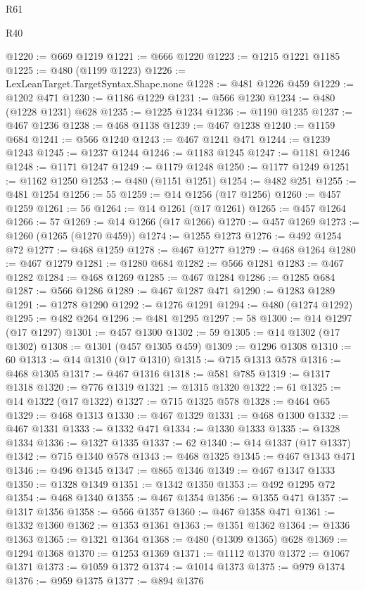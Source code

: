 \begin{lexlean}{R61}
\begin{lexlean}{R40}
\begin{coremodule}
{{{{{{{{{{{{{{{{{{{{{{{{{{{{{{{{{{{{{{{{{{{{{{{{{{{{{{{{{{{{{{{{{{{{{{{{{{{{{{{{{{{{{{{{{{{{{{{{{{{{{{{{{{{{{@1220 := @669 @1219
@1221 := @666 @1220
@1223 := @1215 @1221 @1185
@1225 := @480 (@1199 @1223)
@1226 := LexLeanTarget.TargetSyntax.Shape.none
@1228 := @481 @1226 @459
@1229 := @1202 @471
@1230 := @1186 @1229
@1231 := @566 @1230
@1234 := @480 (@1228 @1231) @628
@1235 := @1225 @1234
@1236 := @1190 @1235
@1237 := @467 @1236
@1238 := @468 @1138
@1239 := @467 @1238
@1240 := @1159 @684
@1241 := @566 @1240
@1243 := @467 @1241 @471
@1244 := @1239 @1243
@1245 := @1237 @1244
@1246 := @1183 @1245
@1247 := @1181 @1246
@1248 := @1171 @1247
@1249 := @1179 @1248
@1250 := @1177 @1249
@1251 := @1162 @1250
@1253 := @480 (@1151 @1251)
@1254 := @482 @251
@1255 := @481 @1254
@1256 := 55
@1259 := @14 @1256 (@17 @1256)
@1260 := @457 @1259
@1261 := 56
@1264 := @14 @1261 (@17 @1261)
@1265 := @457 @1264
@1266 := 57
@1269 := @14 @1266 (@17 @1266)
@1270 := @457 @1269
@1273 := @1260 (@1265 (@1270 @459))
@1274 := @1255 @1273
@1276 := @492 @1254 @72
@1277 := @468 @1259
@1278 := @467 @1277
@1279 := @468 @1264
@1280 := @467 @1279
@1281 := @1280 @684
@1282 := @566 @1281
@1283 := @467 @1282
@1284 := @468 @1269
@1285 := @467 @1284
@1286 := @1285 @684
@1287 := @566 @1286
@1289 := @467 @1287 @471
@1290 := @1283 @1289
@1291 := @1278 @1290
@1292 := @1276 @1291
@1294 := @480 (@1274 @1292)
@1295 := @482 @264
@1296 := @481 @1295
@1297 := 58
@1300 := @14 @1297 (@17 @1297)
@1301 := @457 @1300
@1302 := 59
@1305 := @14 @1302 (@17 @1302)
@1308 := @1301 (@457 @1305 @459)
@1309 := @1296 @1308
@1310 := 60
@1313 := @14 @1310 (@17 @1310)
@1315 := @715 @1313 @578
@1316 := @468 @1305
@1317 := @467 @1316
@1318 := @581 @785
@1319 := @1317 @1318
@1320 := @776 @1319
@1321 := @1315 @1320
@1322 := 61
@1325 := @14 @1322 (@17 @1322)
@1327 := @715 @1325 @578
@1328 := @464 @65
@1329 := @468 @1313
@1330 := @467 @1329
@1331 := @468 @1300
@1332 := @467 @1331
@1333 := @1332 @471
@1334 := @1330 @1333
@1335 := @1328 @1334
@1336 := @1327 @1335
@1337 := 62
@1340 := @14 @1337 (@17 @1337)
@1342 := @715 @1340 @578
@1343 := @468 @1325
@1345 := @467 @1343 @471
@1346 := @496 @1345
@1347 := @865 @1346
@1349 := @467 @1347 @1333
@1350 := @1328 @1349
@1351 := @1342 @1350
@1353 := @492 @1295 @72
@1354 := @468 @1340
@1355 := @467 @1354
@1356 := @1355 @471
@1357 := @1317 @1356
@1358 := @566 @1357
@1360 := @467 @1358 @471
@1361 := @1332 @1360
@1362 := @1353 @1361
@1363 := @1351 @1362
@1364 := @1336 @1363
@1365 := @1321 @1364
@1368 := @480 (@1309 @1365) @628
@1369 := @1294 @1368
@1370 := @1253 @1369
@1371 := @1112 @1370
@1372 := @1067 @1371
@1373 := @1059 @1372
@1374 := @1014 @1373
@1375 := @979 @1374
@1376 := @959 @1375
@1377 := @894 @1376
}}}}}}}}}}}}}}}}}}}}}}}}}}}}}}}}}}}}}}}}}}}}}}}}}}}}}}}}}}}}}}}}}}}}}}}}}}}}}}}}}}}}}}}}}}}}}}}}}}}}}}}}}}}}}
\end{coremodule}
\end{lexlean}
\end{lexlean}
